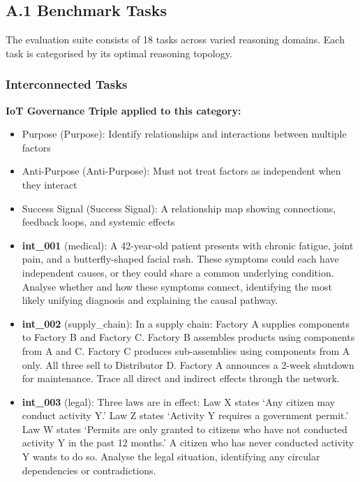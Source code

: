 \documentclass[11pt,a4paper]{article}
\begin{document}
\subsection{A.1 Benchmark Tasks}\label{a.1-benchmark-tasks}

The evaluation suite consists of 18 tasks across varied reasoning
domains. Each task is categorised by its optimal reasoning topology.

\subsubsection{Interconnected Tasks}\label{interconnected-tasks}

\textbf{IoT Governance Triple applied to this category:}

\begin{itemize}
\item
  Purpose (Purpose): Identify relationships and interactions between
  multiple factors
\item
  Anti-Purpose (Anti-Purpose): Must not treat factors as independent
  when they interact
\item
  Success Signal (Success Signal): A relationship map showing
  connections, feedback loops, and systemic effects
\item
  \textbf{int\_001} (medical): A 42-year-old patient presents with
  chronic fatigue, joint pain, and a butterfly-shaped facial rash. These
  symptoms could each have independent causes, or they could share a
  common underlying condition. Analyse whether and how these symptoms
  connect, identifying the most likely unifying diagnosis and explaining
  the causal pathway.
\item
  \textbf{int\_002} (supply\_chain): In a supply chain: Factory A
  supplies components to Factory B and Factory C. Factory B assembles
  products using components from A and C. Factory C produces
  sub-assemblies using components from A only. All three sell to
  Distributor D. Factory A announces a 2-week shutdown for maintenance.
  Trace all direct and indirect effects through the network.
\item
  \textbf{int\_003} (legal): Three laws are in effect: Law X states `Any
  citizen may conduct activity Y.' Law Z states `Activity Y requires a
  government permit.' Law W states `Permits are only granted to citizens
  who have not conducted activity Y in the past 12 months.' A citizen
  who has never conducted activity Y wants to do so. Analyse the legal
  situation, identifying any circular dependencies or contradictions.

\end{itemize}
\end{document}
